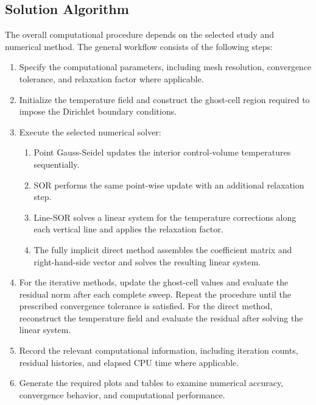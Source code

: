 
\subsection{Solution Algorithm}

The overall computational procedure depends on the selected study and numerical method. The general workflow consists of the following steps:

\begin{enumerate}
    \item Specify the computational parameters, including mesh resolution, convergence tolerance, and relaxation factor where applicable.

    \item Initialize the temperature field and construct the ghost-cell region required to impose the Dirichlet boundary conditions.

    \item Execute the selected numerical solver:
    \begin{enumerate}
        \item Point Gauss-Seidel updates the interior control-volume temperatures sequentially.
        \item SOR performs the same point-wise update with an additional relaxation step.
        \item Line-SOR solves a linear system for the temperature corrections along each vertical line and applies the relaxation factor.
        \item The fully implicit direct method assembles the coefficient matrix and right-hand-side vector and solves the resulting linear system.
    \end{enumerate}

    \item For the iterative methods, update the ghost-cell values and evaluate the residual norm after each complete sweep. Repeat the procedure until the prescribed convergence tolerance is satisfied. For the direct method, reconstruct the temperature field and evaluate the residual after solving the linear system.

    \item Record the relevant computational information, including iteration counts, residual histories, and elapsed CPU time where applicable.

    \item Generate the required plots and tables to examine numerical accuracy, convergence behavior, and computational performance.
\end{enumerate}

